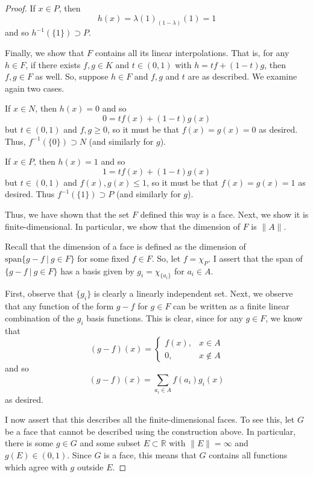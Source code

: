 \documentclass[fontsize=11pt]{scrartcl} %
\numberwithin{equation}{section} %
\numberwithin{figure}{section} %
\numberwithin{table}{section} %
\newcommand{\R}{\mathbb{R}}
\begin{document}
\begin{proof}
    If $x\in P$, then
    \[
        h(x) = \lambda(1) _ (1-\lambda)(1) = 1
    \]
    and so $h^{-1}(\{1\})\supset P$.

    Finally, we show that $F$ contains all its linear interpolations. That is,
    for any $h\in F$, if there exists $f,g\in K$ and $t\in (0,1)$ with
    $h=tf+(1-t)g$, then $f,g\in F$ as well.
    So, suppose $h\in F$ and $f,g$ and $t$ are as described. We examine again
    two cases.

    If $x\in N$, then $h(x)=0$ and so
    \[
        0=tf(x)+(1-t)g(x)
    \]
    but $t\in (0,1)$ and $f,g\geq 0$, so it must be that $f(x) = g(x) = 0$ as
    desired. Thus, $f^{-1}(\{0\})\supset N$ (and similarly for $g$).

    If $x\in P$, then $h(x) = 1$ and so
    \[
        1= tf(x) + (1-t)g(x)
    \]
    but $t\in(0,1)$ and $f(x),g(x)\leq 1$, so it must be that $f(x)=g(x)=1$ as
    desired. Thus $f^{-1}(\{1\})\supset P$ (and similarly for $g$).

    Thus, we have shown that the set $F$ defined this way is a face. Next, we
    show it is finite-dimensional. In particular, we show that the dimension of
    $F$ is $\|A\|$.

    Recall that the dimension of a face is defined as the dimension of
    $\text{span}\{g-f\ |\ g\in F\}$ for some fixed $f\in F$. 
    So, let $f = \chi_P$. I assert that the span of $\{g-f\ |\ g\in F\}$ has a
    basis given by $g_i = \chi_{\{a_i\}}$ for $a_i\in A$.

    First, observe that $\{g_i\}$ is clearly a linearly independent set. Next,
    we observe that any function of the form $g-f$ for $g\in F$ can be written
    as a finite linear combination of the $g_i$ basis functions. This is clear,
    since for any $g\in F$, we know that
    \[
        (g-f)(x) =
        \begin{cases}
            f(x), &x\in A\\
            0, &x\not\in A
        \end{cases}
    \]
    and so
    \[
        (g-f)(x) = \sum_{a_i\in A}f(a_i)g_i(x)
    \]
    as desired.

    I now assert that this describes all the finite-dimensional faces. To see
    this, let $G$ be a face that cannot be described using the construction
    above. In particular, there is some $g\in G$ and some subset $E\subset\R$
    with $\|E\|=\infty$ and $g(E)\in (0,1)$. Since $G$ is a face, this means
    that $G$ contains all functions which agree with $g$ outside $E$.


\end{proof}
\end{document}
